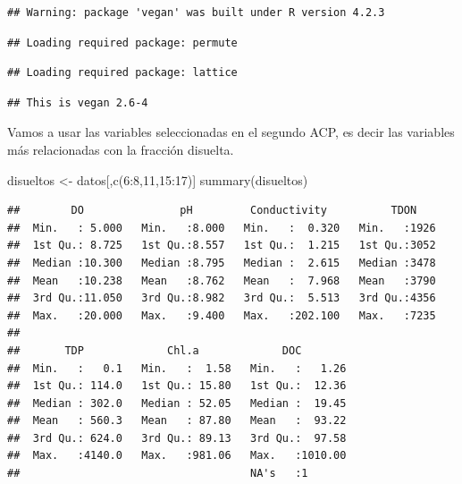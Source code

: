 \documentclass[
]{book}
\newenvironment{Shaded}{\begin{snugshade}}{\end{snugshade}}
\newcommand{\DecValTok}[1]{\textcolor[rgb]{0.00,0.00,0.81}{#1}}
\newcommand{\FunctionTok}[1]{\textcolor[rgb]{0.00,0.00,0.00}{#1}}
\newcommand{\NormalTok}[1]{#1}
\newcommand{\OtherTok}[1]{\textcolor[rgb]{0.56,0.35,0.01}{#1}}
\newcommand{\SpecialCharTok}[1]{\textcolor[rgb]{0.00,0.00,0.00}{#1}}
\begin{document}
\begin{verbatim}
## Warning: package 'vegan' was built under R version 4.2.3
\end{verbatim}

\begin{verbatim}
## Loading required package: permute
\end{verbatim}

\begin{verbatim}
## Loading required package: lattice
\end{verbatim}

\begin{verbatim}
## This is vegan 2.6-4
\end{verbatim}

Vamos a usar las variables seleccionadas en el segundo ACP, es decir las variables más relacionadas con la fracción disuelta.

\begin{Shaded}
\begin{Highlighting}[]
\NormalTok{disueltos }\OtherTok{\textless{}{-}}\NormalTok{ datos[,}\FunctionTok{c}\NormalTok{(}\DecValTok{6}\SpecialCharTok{:}\DecValTok{8}\NormalTok{,}\DecValTok{11}\NormalTok{,}\DecValTok{15}\SpecialCharTok{:}\DecValTok{17}\NormalTok{)]}
\FunctionTok{summary}\NormalTok{(disueltos)}
\end{Highlighting}
\end{Shaded}

\begin{verbatim}
##        DO               pH         Conductivity          TDON     
##  Min.   : 5.000   Min.   :8.000   Min.   :  0.320   Min.   :1926  
##  1st Qu.: 8.725   1st Qu.:8.557   1st Qu.:  1.215   1st Qu.:3052  
##  Median :10.300   Median :8.795   Median :  2.615   Median :3478  
##  Mean   :10.238   Mean   :8.762   Mean   :  7.968   Mean   :3790  
##  3rd Qu.:11.050   3rd Qu.:8.982   3rd Qu.:  5.513   3rd Qu.:4356  
##  Max.   :20.000   Max.   :9.400   Max.   :202.100   Max.   :7235  
##                                                                   
##       TDP             Chl.a             DOC         
##  Min.   :   0.1   Min.   :  1.58   Min.   :   1.26  
##  1st Qu.: 114.0   1st Qu.: 15.80   1st Qu.:  12.36  
##  Median : 302.0   Median : 52.05   Median :  19.45  
##  Mean   : 560.3   Mean   : 87.80   Mean   :  93.22  
##  3rd Qu.: 624.0   3rd Qu.: 89.13   3rd Qu.:  97.58  
##  Max.   :4140.0   Max.   :981.06   Max.   :1010.00  
##                                    NA's   :1
\end{verbatim}
\end{document}
